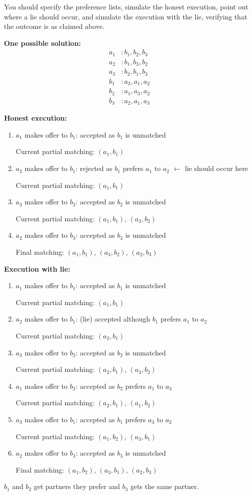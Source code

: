 \documentclass[12pt]{article}
\begin{document}
You should specify the preference lists, simulate the honest execution, point out where a lie should occur, and simulate the execution with the lie, verifying that the outcome is as claimed above.

\textbf{One possible solution:}
\begin{align*}
a_1 &: b_1,b_2,b_3\\
a_2 &: b_1,b_3,b_2\\
a_3 &: b_2,b_1,b_3\\[4pt]
b_1 &: a_3,a_1,a_2\\
b_2 &: a_1,a_3,a_2\\
b_3 &: a_2,a_1,a_3
\end{align*}

\textbf{Honest execution:}
\begin{enumerate}
\item $a_1$ makes offer to $b_1$: accepted as $b_1$ is unmatched

Current partial matching: $(a_1,b_1)$
\item $a_2$ makes offer to $b_1$: rejected as $b_1$ prefers $a_1$ to $a_2$ $\leftarrow$ lie should occur here

Current partial matching: $(a_1,b_1)$
\item $a_3$ makes offer to $b_2$: accepted as $b_2$ is unmatched

Current partial matching: $(a_1,b_1)$, $(a_3,b_2)$
\item $a_2$ makes offer to $b_3$: accepted as $b_3$ is unmatched

Final matching: $(a_1,b_1)$, $(a_3,b_2)$, $(a_2,b_3)$
\end{enumerate}

\textbf{Execution with lie:}
\begin{enumerate}
\item $a_1$ makes offer to $b_1$: accepted as $b_1$ is unmatched

Current partial matching: $(a_1,b_1)$
\item $a_2$ makes offer to $b_1$: (lie) accepted although $b_1$ prefers $a_1$ to $a_2$

Current partial matching: $(a_2,b_1)$
\item $a_3$ makes offer to $b_2$: accepted as $b_2$ is unmatched

Current partial matching: $(a_2,b_1)$, $(a_3,b_2)$
\item $a_1$ makes offer to $b_2$: accepted as $b_2$ prefers $a_1$ to $a_3$

Current partial matching: $(a_2,b_1)$, $(a_1,b_2)$
\item $a_3$ makes offer to $b_1$: accepted as $b_1$ prefers $a_3$ to $a_2$

Current partial matching: $(a_1,b_2)$, $(a_3,b_1)$
\item $a_2$ makes offer to $b_3$: accepted as $b_3$ is unmatched

Final matching: $(a_1,b_2)$, $(a_3,b_1)$, $(a_2,b_3)$
\end{enumerate}
$b_1$ and $b_2$ get partners they prefer and $b_3$ gets the same partner.
\end{document}
